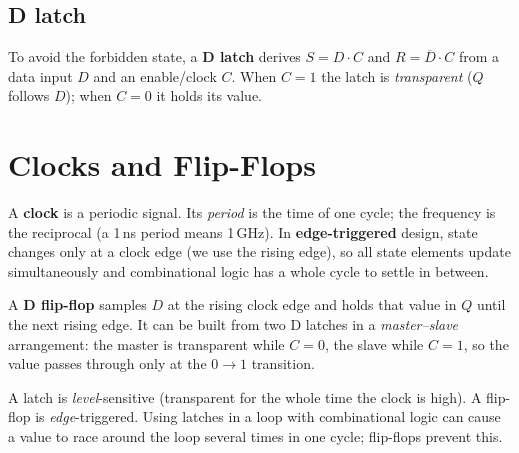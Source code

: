 \subsection{D latch}

To avoid the forbidden state, a \textbf{D latch} derives $S = D\cdot C$ and
$R = \overline{D}\cdot C$ from a data input $D$ and an enable/clock $C$.
When $C = 1$ the latch is \emph{transparent} ($Q$ follows $D$); when $C = 0$
it holds its value.

\section{Clocks and Flip-Flops}

A \textbf{clock} is a periodic signal. Its \emph{period} is the time of one
cycle; the frequency is the reciprocal (a 1\,ns period means 1\,GHz). In
\textbf{edge-triggered} design, state changes only at a clock edge (we use
the rising edge), so all state elements update simultaneously and
combinational logic has a whole cycle to settle in between.

\begin{definition}
A \textbf{D flip-flop} samples $D$ at the rising clock edge and holds that
value in $Q$ until the next rising edge. It can be built from two D latches
in a \emph{master--slave} arrangement: the master is transparent while
$C = 0$, the slave while $C = 1$, so the value passes through only at the
$0 \to 1$ transition.
\end{definition}

\begin{important}
A latch is \emph{level}-sensitive (transparent for the whole time the clock
is high). A flip-flop is \emph{edge}-triggered. Using latches in a loop with
combinational logic can cause a value to race around the loop several times
in one cycle; flip-flops prevent this.
\end{important}

